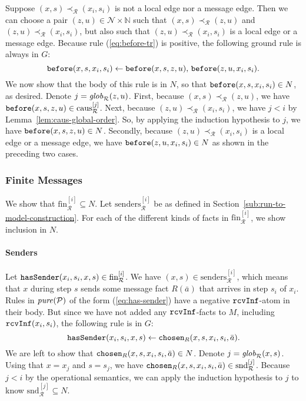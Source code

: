 \documentclass{tlp}
\newcommand{\Nat}{\mathbb{N}}  \newcommand{\len}[1]{|#1|} \newcommand{\rom}[1]{\text{\emph{(#1)}}} \newcommand{\romI}{\rom i}
\newcommand{\ded}{\mathcal{P}}
\newcommand{\nw}{\mathcal{N}}
\newcommand{\before}{\pred{before}}
\newcommand{\chosen}{\pred{chosen}}
\newcommand{\rcvinf}{\pred{rcvInf}}
\newcommand{\hassender}{\pred{hasSender}}
\newcommand{\pure}[1]{\fname{pure}(#1)}
\newcommand{\run}{\mathcal{R}}
\newcommand{\globR}[1]{\fname{glob}_{\run}(#1)}
\newcommand{\nwnat}{\nw\times\Nat}
\newcommand{\slicefin}[1]{\text{fin}_{\run}^{[#1]}}
\newcommand{\slicesnd}[1]{\text{snd}_{\run}^{[#1]}}
\newcommand{\slicecaus}[1]{\text{caus}_{\run}^{[#1]}}
\newcommand{\senders}[1]{\text{senders}_{\run}^{[#1]}}
\newcommand{\caus}{\prec_{\run}}
\newcommand{\grded}{G}
\begin{document}
\begin{appendix}
Suppose $(x,s)\caus(x_{i},s_{i})$ is not a local edge nor a message
edge. Then we can choose a pair $(z,u)\in\nwnat$ such that $(x,s)\caus(z,u)$
and $(z,u)\caus(x_{i},s_{i})$, but also such that $(z,u)\caus(x_{i},s_{i})$
is a local edge or a message edge. Because rule (\ref{eq:before-tr})
is positive, the following ground rule is always in $\grded$:
\[
\before(x,s,x_{i},s_{i})\gets\before(x,s,z,u),\,\before(z,u,x_{i},s_{i}).
\]
We now show that the body of this rule is in $N$, so that $\before(x,s,x_{i},s_{i})\in N$,
as desired. Denote $j=\globR{z,u}$. First, because $(x,s)\caus(z,u)$,
we have $\before(x,s,z,u)\in\slicecaus j$. Next, because $(z,u)\caus(x_{i},s_{i})$,
we have $j<i$ by Lemma~\ref{lem:caus-global-order}. So, by applying
the induction hypothesis to $j$, we have $\before(x,s,z,u)\in N$.
Secondly, because $(z,u)\caus(x_{i},s_{i})$ is a local edge or a
message edge, we have $\before(z,u,x_{i},s_{i})\in N$ as shown in
the preceding two cases.


\subsubsection{Finite Messages}

We show that $\slicefin i\subseteq N$. Let $\senders i$ be as defined
in Section~\ref{sub:run-to-model-construction}. For each of the
different kinds of facts in $\slicefin i$, we show inclusion in $N$.




\paragraph*{Senders}

Let $\hassender(x_{i},s_{i},x,s)\in\slicefin i$. We have $(x,s)\in\senders i$,
which means that $x$ during step $s$ sends some message fact $R(\bar{a})$
that arrives in step $s_{i}$ of $x_{i}$. Rules in $\pure{\ded}$
of the form (\ref{eq:has-sender}) have a negative $\rcvinf$-atom
in their body. But since we have not added any $\rcvinf$-facts to
$M$, including $\rcvinf(x_{i},s_{i})$, the following rule is in
$\grded$:
\[
\hassender(x_{i},s_{i},x,s)\gets\chosen_{R}(x,s,x_{i},s_{i},\bar{a}).
\]
We are left to show that $\chosen_{R}(x,s,x_{i},s_{i},\bar{a})\in N$.
Denote $j=\globR{x,s}$. Using that $x=x_{j}$ and $s=s_{j}$, we
have $\chosen_{R}(x,s,x_{i},s_{i},\bar{a})\in\slicesnd j$. Because
$j<i$ by the operational semantics, we can apply the induction hypothesis
to $j$ to know $\slicesnd j\subseteq N$.





\end{appendix}
\end{document}
